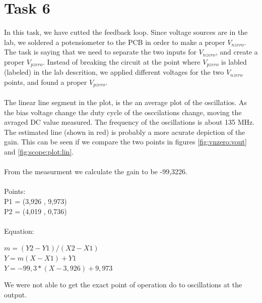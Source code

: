 \documentclass[a4paper,english,11pt]{article}
\begin{document}
\section{Task 6}
In this task, we have cutted the feedback loop. Since voltage sources are in the lab, we soldered a potensiometer to the PCB
in order to make a proper $V_{nzero}$. The task is saying that we need to separate the two inputs for $V_{nzero}$, and create a proper $V_{pzero}$.
Instead of breaking the circuit at the point where $V_{pzero}$ is labled (labeled) in the lab descrition, we applied different voltages for the two 
$V_{nzero}$ points, and found a proper $V_{pzero}$. 
\\
\\
The linear line segment in the plot, is the an average plot of the oscillatios. As the bias voltage change the duty cycle of the osccilations change, moving the avraged DC value measured. The frequency of the oscillations is about 135 MHz. 
The estimated line (shown in red) is probably a more acurate depiction of the gain.
This can be seen if we compare the two points in figures \ref{fig:vnzero:vout} and \ref{fig:scope:plot:lin}.\\
\\
From the measurment we calculate the gain to be -99,3226.\\
\\
Points:\\
P1 = (3,926 , 9,973)\\
P2 = (4,019 , 0,736)\\
\\
Equation:
\begin{center}
$m = (Y2 - Y1) / (X2 - X1)$\\
$Y = m(X - X1) + Y1$\\
$Y = -99,3 * (X - 3,926) + 9,973$
\end{center}
We were not able to get the exact point of operation do to oscillations at the output. 
\end{document}
